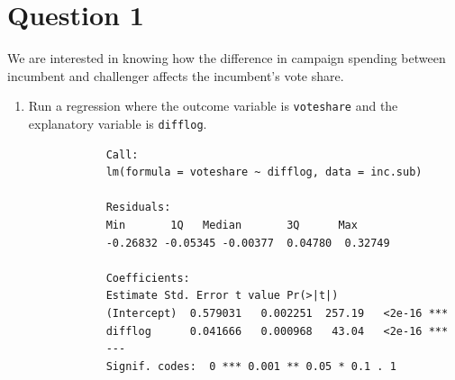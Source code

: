\documentclass[12pt,letterpaper]{article}
\begin{document}
\section*{Question 1}
\vspace{.25cm}
\noindent We are interested in knowing how the difference in campaign spending between incumbent and challenger affects the incumbent's vote share. 
	\begin{enumerate}
		\item Run a regression where the outcome variable is \texttt{voteshare} and the explanatory variable is \texttt{difflog}.	\vspace{5cm}
		
		\begin{lstlisting}
			Call:
			lm(formula = voteshare ~ difflog, data = inc.sub)
			
			Residuals:
			Min       1Q   Median       3Q      Max
			-0.26832 -0.05345 -0.00377  0.04780  0.32749
			
			Coefficients:
			Estimate Std. Error t value Pr(>|t|)
			(Intercept)  0.579031   0.002251  257.19   <2e-16 ***
			difflog      0.041666   0.000968   43.04   <2e-16 ***
			---
			Signif. codes:  0 *** 0.001 ** 0.05 * 0.1 . 1
			

\end{lstlisting}
\end{enumerate}
\end{document}
